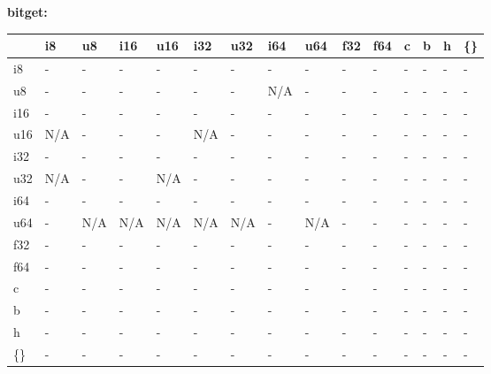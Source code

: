 \textbf{bitget:}
\begin{scriptsize}\begin{tt}\begin{center}\vspace{-.3cm}\begin{tabular}{|m{.65cm}||m{.65cm}|m{.65cm}|m{.65cm}|m{.65cm}|m{.65cm}|m{.65cm}|m{.65cm}|m{.65cm}|m{.65cm}|m{.65cm}|m{.65cm}|m{.65cm}|m{.65cm}|m{.65cm}|}\hline 
&i8&u8&i16&u16&i32&u32&i64&u64&f32&f64&c&b&h&\{\}\\ \hline \hline
i8&-&-&-&-&-&-&-&-&-&-&-&-&-&-\\ \hline
u8&-&-&-&-&-&-&N/A&-&-&-&-&-&-&-\\ \hline
i16&-&-&-&-&-&-&-&-&-&-&-&-&-&-\\ \hline
u16&N/A&-&-&-&N/A&-&-&-&-&-&-&-&-&-\\ \hline
i32&-&-&-&-&-&-&-&-&-&-&-&-&-&-\\ \hline
u32&N/A&-&-&N/A&-&-&-&-&-&-&-&-&-&-\\ \hline
i64&-&-&-&-&-&-&-&-&-&-&-&-&-&-\\ \hline
u64&-&N/A&N/A&N/A&N/A&N/A&-&N/A&-&-&-&-&-&-\\ \hline
f32&-&-&-&-&-&-&-&-&-&-&-&-&-&-\\ \hline
f64&-&-&-&-&-&-&-&-&-&-&-&-&-&-\\ \hline
c&-&-&-&-&-&-&-&-&-&-&-&-&-&-\\ \hline
b&-&-&-&-&-&-&-&-&-&-&-&-&-&-\\ \hline
h&-&-&-&-&-&-&-&-&-&-&-&-&-&-\\ \hline
\{\}&-&-&-&-&-&-&-&-&-&-&-&-&-&-\\ \hline
\end{tabular}\end{center}\end{tt}\end{scriptsize} 

